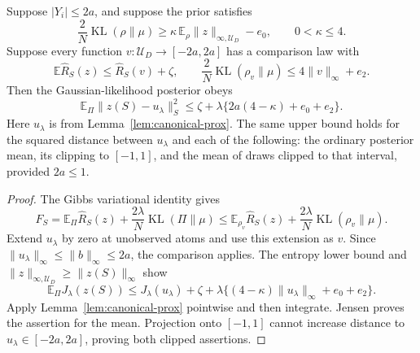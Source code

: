 \begin{lemma}
\label{lem:canonical-posterior-prox}
Suppose $|Y_i|\le2a$, and suppose the prior satisfies
\[
 \frac2N\operatorname{KL}(\rho\|\mu)
 \ge\kappa\,\mathbb E_\rho\|z\|_{\infty,\mathcal U_D}-e_0,
 \qquad 0<\kappa\le4.
\]
Suppose every function $v:\mathcal U_D\to[-2a,2a]$ has a comparison law with
\[
 \mathbb E\widehat R_S(z)\le\widehat R_S(v)+\zeta,
 \qquad
 \frac2N\operatorname{KL}(\rho_v\|\mu)\le4\|v\|_\infty+e_2.
\]
Then the Gaussian-likelihood posterior obeys
\[
 \mathbb E_\Pi\|z(S)-u_\lambda\|_S^2
 \le\zeta+\lambda\{2a(4-\kappa)+e_0+e_2\}.
 \tag{*}\label{eq:canonical-prox-gap}
\]
Here $u_\lambda$ is from Lemma~\ref{lem:canonical-prox}. The same upper bound holds for the squared distance between $u_\lambda$ and each of the following: the ordinary posterior mean, its clipping to $[-1,1]$, and the mean of draws clipped to that interval, provided $2a\le1$.
\end{lemma}
\begin{proof}
The Gibbs variational identity gives
\[
 F_S=\mathbb E_\Pi\widehat R_S(z)+\frac{2\lambda}{N}\operatorname{KL}(\Pi\|\mu)
 \le\mathbb E_{\rho_v}\widehat R_S(z)+\frac{2\lambda}{N}\operatorname{KL}(\rho_v\|\mu).
\]
Extend $u_\lambda$ by zero at unobserved atoms and use this extension as $v$. Since $\|u_\lambda\|_\infty\le\|b\|_\infty\le2a$, the comparison applies. The entropy lower bound and $\|z\|_{\infty,\mathcal U_D}\ge\|z(S)\|_\infty$ show
\[
 \mathbb E_\Pi J_\lambda(z(S))
 \le J_\lambda(u_\lambda)+\zeta+
       \lambda\{(4-\kappa)\|u_\lambda\|_\infty+e_0+e_2\}.
\]
Apply Lemma~\ref{lem:canonical-prox} pointwise and then integrate. Jensen proves the assertion for the mean. Projection onto $[-1,1]$ cannot increase distance to $u_\lambda\in[-2a,2a]$, proving both clipped assertions.
\end{proof}

